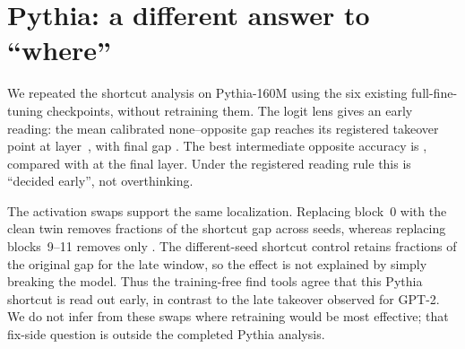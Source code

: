 \section{Pythia: a different answer to ``where''}
\label{sec:pythia}

We repeated the shortcut analysis on Pythia-160M using the six existing
full-fine-tuning checkpoints, without retraining them.  The logit lens gives
an early reading: the mean calibrated none--opposite gap reaches its
registered takeover point at layer~\pythiaLensTakeoverPythia{}, with final
gap \pythiaLensFinalGapPythia{}.  The best intermediate opposite accuracy is
\pythiaLensBestOppositePythia{}, compared with
\pythiaLensFinalOppositePythia{} at the final layer.  Under the registered
reading rule this is ``decided early'', not overthinking.

The activation swaps support the same localization.  Replacing block~0 with
the clean twin removes fractions
\pythiaSwapBlockZeroRemovedPythia{} of the shortcut gap across seeds, whereas
replacing blocks~9--11 removes only
\pythiaSwapLateRemovedPythia{}.  The different-seed shortcut control retains
fractions \pythiaSwapCiiKeptPythia{} of the original gap for the late window,
so the effect is not explained by simply breaking the model.  Thus the
training-free find tools agree that this Pythia shortcut is read out early,
in contrast to the late takeover observed for GPT-2.  We do not infer from
these swaps where retraining would be most effective; that fix-side question
is outside the completed Pythia analysis.

